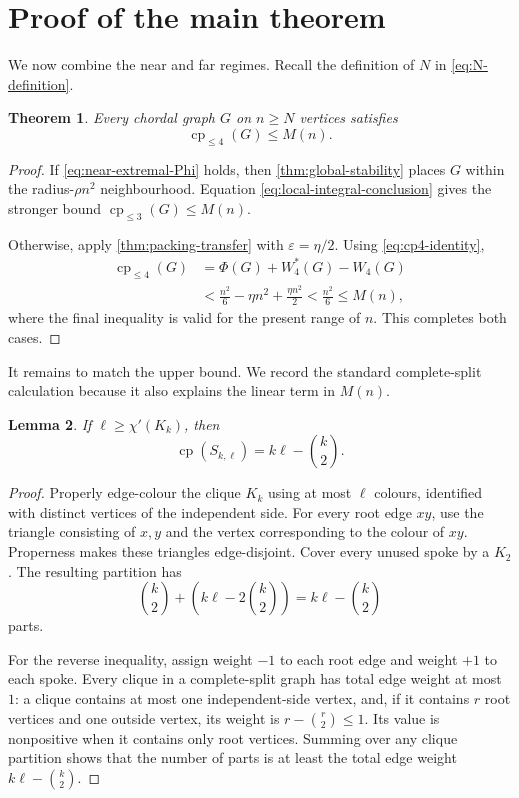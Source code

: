 \documentclass[11pt,reqno]{amsart}
\numberwithin{equation}{section}
\newtheorem{theorem}{Theorem}[section]
\newtheorem{lemma}[theorem]{Lemma}
\theoremstyle{definition}
\theoremstyle{remark}
\newcommand{\cp}{\operatorname{cp}}
\newcommand{\cple}[1]{\operatorname{cp}_{\leq #1}}
\newcommand{\Wint}{W_4}
\newcommand{\Wfrac}{W_4^*}
\newcommand{\PhiF}{\Phi}
\begin{document}
\section{Proof of the main theorem}

We now combine the near and far regimes.  Recall the definition of $N$ in
\eqref{eq:N-definition}.

\begin{theorem}\label{thm:eventual-upper}
Every chordal graph $G$ on $n\geq N$ vertices satisfies
\[
  \cple{4}(G)\leq M(n).
\]
\end{theorem}

\begin{proof}
If \eqref{eq:near-extremal-Phi} holds, then
\cref{thm:global-stability} places $G$ within the radius-$\rho n^2$
neighbourhood.  Equation \eqref{eq:local-integral-conclusion} gives the
stronger bound $\cple{3}(G)\leq M(n)$.

Otherwise, apply \cref{thm:packing-transfer} with $\varepsilon=\eta/2$.
Using \eqref{eq:cp4-identity},
\begin{align*}
  \cple{4}(G)
  &=\PhiF(G)+\Wfrac(G)-\Wint(G)\\
  &<\frac{n^2}{6}-\eta n^2+\frac{\eta n^2}{2}
   <\frac{n^2}{6}\leq M(n),
\end{align*}
where the final inequality is valid for the present range of $n$.  This
completes both cases.
\end{proof}

It remains to match the upper bound.  We record the standard complete-split
calculation because it also explains the linear term in $M(n)$.

\begin{lemma}\label{lem:split-exact-cp}
If $\ell\geq\chi'(K_k)$, then
\begin{equation}\label{eq:split-exact-cp}
  \cp(S_{k,\ell})=k\ell-\binom k2.
\end{equation}
\end{lemma}

\begin{proof}
Properly edge-colour the clique $K_k$ using at most $\ell$ colours, identified
with distinct vertices of the independent side.  For every root edge $xy$,
use the triangle consisting of $x,y$ and the vertex corresponding to the
colour of $xy$.  Properness makes these triangles edge-disjoint.  Cover every
unused spoke by a $K_2$.  The resulting partition has
\[
  \binom k2+\left(k\ell-2\binom k2\right)
  =k\ell-\binom k2
\]
parts.

For the reverse inequality, assign weight $-1$ to each root edge and weight
$+1$ to each spoke.  Every clique in a complete-split graph has total edge
weight at most $1$: a clique contains at most one independent-side vertex,
and, if it contains $r$ root vertices and one outside vertex, its weight is
$r-\binom r2\leq1$.  Its value is nonpositive when it contains only root
vertices.  Summing over any clique partition shows that the number of parts is
at least the total edge weight $k\ell-\binom{k}{2}$.
\end{proof}
\end{document}
